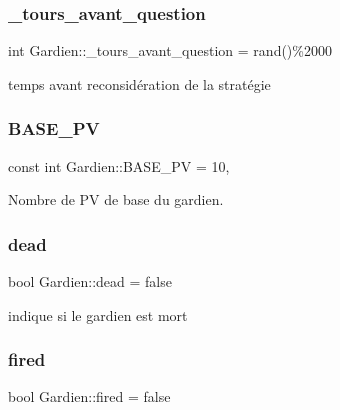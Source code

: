 \subsubsection{\texorpdfstring{\+\_\+tours\+\_\+avant\+\_\+question}{\_tours\_avant\_question}}
{\footnotesize\ttfamily int Gardien\+::\+\_\+tours\+\_\+avant\+\_\+question = rand()\%2000\hspace{0.3cm}{\ttfamily [private]}}



temps avant reconsidération de la stratégie 

\mbox{\label{classGardien_a1832c02b32c6e47b240536fd6ba47812}} 
\subsubsection{\texorpdfstring{B\+A\+S\+E\+\_\+\+PV}{BASE\_PV}}
{\footnotesize\ttfamily const int Gardien\+::\+B\+A\+S\+E\+\_\+\+PV = 10\hspace{0.3cm}{\ttfamily [static]}, {\ttfamily [private]}}



Nombre de PV de base du gardien. 

\mbox{\label{classGardien_ad418641d97373fb9304fc76f78c817ac}} 
\subsubsection{\texorpdfstring{dead}{dead}}
{\footnotesize\ttfamily bool Gardien\+::dead = false\hspace{0.3cm}{\ttfamily [private]}}



indique si le gardien est mort 

\mbox{\label{classGardien_a8ca3f9b553e9248f36735dde604fd756}} 
\subsubsection{\texorpdfstring{fired}{fired}}
{\footnotesize\ttfamily bool Gardien\+::fired = false\hspace{0.3cm}{\ttfamily [private]}}



